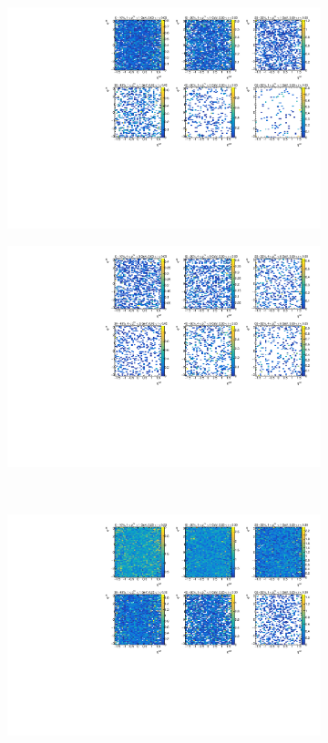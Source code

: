 \begin{figure}
\begin{subfigure}{.5\textwidth}
\centering \includegraphics[width=1\textwidth]{figures/main/UE/eta_phi_map_trk2_dR0}
\caption{}
\end{subfigure}
\begin{subfigure}{.5\textwidth}
\centering \includegraphics[width=1\textwidth]{figures/main/UE/eta_phi_map_trk6_dR0}
\caption{}
\end{subfigure} \\
\begin{subfigure}{.5\textwidth}
\centering \includegraphics[width=1\textwidth]{figures/main/UE/eta_phi_map_trk2_dR5}

\end{subfigure}
\end{figure}
